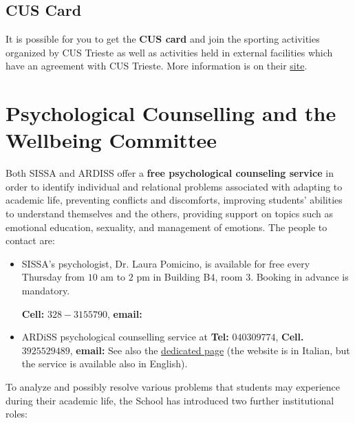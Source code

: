 \documentclass{sissavademecum}
\begin{document}
\section{CUS Card}

It is possible for you to get the \textbf{CUS card} and join the sporting activities organized by CUS Trieste as well as activities held in
external facilities which have an agreement with CUS Trieste. More information is on their \href{http://www.cus.units.it/home.php}{site}.


\chapter{Psychological Counselling and the Wellbeing Committee }

Both SISSA and ARDISS offer a \textbf{free psychological counseling service} in order to identify individual and relational problems associated with adapting to academic life, preventing conflicts and 	discomforts, improving students' abilities to understand themselves and the others, providing support on topics such as emotional education, sexuality, and management of emotions. The people to contact are:
\begin{itemize}
	\item SISSA's psychologist, Dr. Laura Pomicino, is available for free every Thursday from $10$ am to $2$ pm in Building B$4$, room $3$. Booking in advance is mandatory. 
	
	\textbf{Cell: }$328-3155790$, \textbf{email: }{}
	
	\item ARDiSS psychological counselling service at 	\textbf{Tel: }$040 309774$, \textbf{Cell. }$392 5529489$, \textbf{email:} {} See also the \href{http://www.ardiss.fvg.it/contenuti.php?view=page&id=46}{dedicated page} (the website is in Italian, but the service is available also in English).
\end{itemize}

To analyze and possibly resolve various problems that students may experience during their academic life, the School has introduced two further institutional roles:
\end{document}
